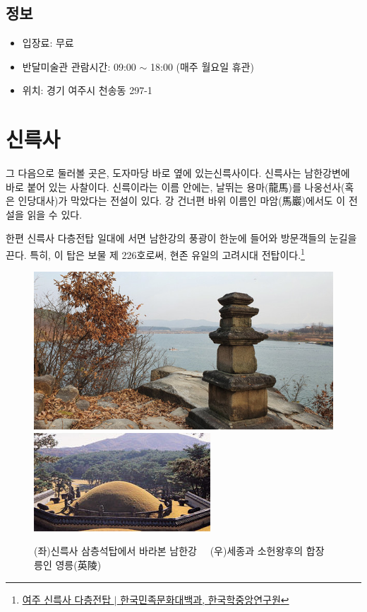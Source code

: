 \subsection{정보}

\begin{itemize}
\item 입장료: 무료
\item 반달미술관 관람시간: 09:00 $\sim$ 18:00 (매주 월요일 휴관)
\item 위치: 경기 여주시 천송동 297-1
\end{itemize}

\section{신륵사}
그 다음으로 둘러볼 곳은, 도자마당 바로 옆에 있는신륵사이다. 신륵사는 남한강변에 바로 붙어 있는 사찰이다. 
신륵이라는 이름 안에는, 날뛰는 용마(龍馬)를 나웅선사(혹은 인당대사)가 막았다는 전설이 있다.
강 건너편 바위 이름인 마암(馬巖)에서도 이 전설을 읽을 수 있다.


한편 신륵사 다층전탑 일대에 서면 남한강의 풍광이 한눈에 들어와 방문객들의 눈길을 끈다. 
특히, 이 탑은 보물 제 226호로써, 현존 유일의 고려시대 전탑이다.\footnote{
\href{https://terms.naver.com/entry.naver?docId=560144&cid=46656&categoryId=46656}{여주 신륵사 다층전탑 $|$ 한국민족문화대백과, 한국학중앙연구원}} 
 
 \begin{figure}
    \centering
    \includegraphics[width=.4\textwidth]{img/신륵사 삼층석탑.jpg}
    \includegraphics[width=.4\textwidth]{img/영릉.jpg}
    \caption{(좌)신륵사 삼층석탑에서 바라본 남한강\protect\footnotemark  $\quad$ (우)세종과 소헌왕후의 합장릉인 영릉(英陵)\protect\footnotemark}
    \label{fig:my_labe5}
\end{figure}

